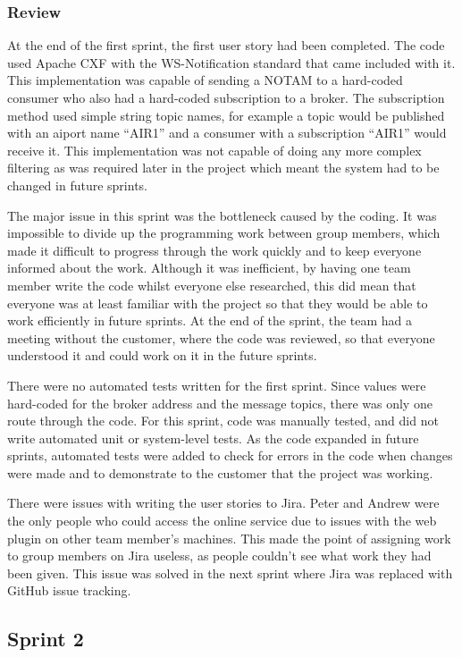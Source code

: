 \documentclass[a4paper, 12pt, twoside]{article}
\begin{document}
\subsubsection{Review}

At the end of the first sprint, the first user story had been completed. The code used Apache CXF with the WS-Notification standard that came included with it. This implementation was capable of sending a NOTAM to a hard-coded consumer who also had a hard-coded subscription to a broker. The subscription method used simple string topic names, for example a topic would be published with an aiport name ``AIR1'' and a consumer with a subscription ``AIR1'' would receive it. This implementation was not capable of doing any more complex filtering as was required later in the project which meant the system had to be changed in future sprints.

The major issue in this sprint was the bottleneck caused by the coding. It was impossible to divide up the programming work between group members, which made it difficult to progress through the work quickly and to keep everyone informed about the work. Although it was inefficient, by having one team member write the code whilst everyone else researched, this did mean that everyone was at least familiar with the project so that they would be able to work efficiently in future sprints. At the end of the sprint, the team had a meeting without the customer, where the code was reviewed, so that everyone understood it and could work on it in the future sprints.

There were no automated tests written for the first sprint. Since values were hard-coded for the broker address and the message topics, there was only one route through the code. For this sprint, code was manually tested, and did not write automated unit or system-level tests. As the code expanded in future sprints, automated tests were added to check for errors in the code when changes were made and to demonstrate to the customer that the project was working.

There were issues with writing the user stories to Jira. Peter and Andrew were the only people who could access the online service due to issues with the web plugin on other team member's machines. This made the point of assigning work to group members on Jira useless, as people couldn't see what work they had been given. This issue was solved in the next sprint where Jira was replaced with GitHub issue tracking.

\subsection{Sprint 2}
\label{sec:impl_sprint_2}
\end{document}
